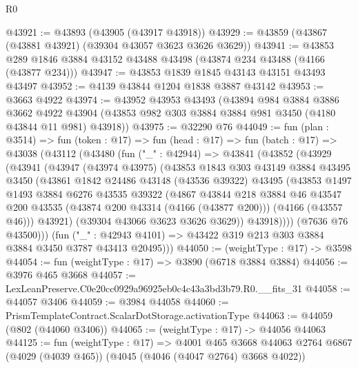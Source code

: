 \begin{lexlean}{R0}
\begin{coremodule}
@43921 := @43893 (@43905 (@43917 @43918))
@43929 := @43859 (@43867 (@43881 @43921) (@39304 @43057 @3623 @3626 @3629))
@43941 := @43853 @289 @1846 @3884 @43152 @43488 @43498 (@43874 @234 @43488 (@4166 (@43877 @234)))
@43947 := @43853 @1839 @1845 @43143 @43151 @43493 @43497
@43952 := @4139 @43844 @1204 @1838 @3887 @43142
@43953 := @3663 @4922
@43974 := @43952
    @43953
    @43493
    (@43894
      @984
      @3884
      @3886
      @3662
      @4922
      @43904
      (@43853 @982 @303 @3884 @3884 @981 @3450 (@4180 @43844 @11 @981) @43918))
@43975 := @32290 @76
@44049 := fun (plan : @3514) =>
  fun (token : @17) =>
  fun (head : @17) =>
  fun (batch : @17) =>
  @43038
    (@43112
      (@43480
        (fun ("_" : @42944) =>
        @43841
          (@43852
            (@43929
              (@43941
                (@43947
                  (@43974 @43975)
                  (@43853
                    @1843
                    @303
                    @43149
                    @3884
                    @43495
                    @3450
                    (@43861
                      @1842
                      @24486
                      @43148
                      (@43536 @39322)
                      @43495
                      (@43853
                        @1497
                        @1493
                        @3884
                        @6276
                        @43535
                        @39322
                        (@4867
                          @43844
                          @218
                          @3884
                          @46
                          @43547
                          @200
                          @43535
                          (@43874 @200 @43314 (@4166 (@43877 @200)))
                          (@4166 (@43557 @46)))
                        @43921)
                      (@39304 @43066 @3623 @3626 @3629))
                    @43918))))
            (@7636 @76 @43500)))
        (fun ("_" : @42943 @4101) => @43422 @319 @213 @303 @3884 @3884 @3450 @3787 @43413 @20495)))
@44050 := (weightType : @17) -> @3598
@44054 := fun (weightType : @17) => @3890 (@6718 @3884 @3884)
@44056 := @3976 @465 @3668
@44057 := LexLeanPreserve.C0e20cc0929a96925eb0c4c43a3bd3b79.R0.__fits_31
@44058 := @44057 @3406
@44059 := @3984 @44058
@44060 := PrismTemplateContract.ScalarDotStorage.activationType
@44063 := @44059 (@802 (@44060 @3406))
@44065 := (weightType : @17) -> @44056 @44063
@44125 := fun (weightType : @17) =>
  @4001
    @465
    @3668
    @44063
    @2764
    @6867
    (@4029 (@4039 @465))
    (@4045 (@4046 (@4047 @2764) @3668 @4022))

\end{coremodule}
\end{lexlean}
